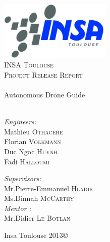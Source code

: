 \begin{titlepage}

\begin{center}


\includegraphics[width=0.4\textwidth]{./imgs/logo_insa.png}\\[2cm]    

\textsc{\LARGE INSA Toulouse}\\[1.5cm]

\textsc{\Large Project Release Report }\\[0.5cm]


\HRule \\[0.4cm]
{ \huge  Autonomous Drone Guide}\\[0.4cm]

\HRule \\[1.5cm]

\begin{minipage}{0.4\textwidth}
\begin{flushleft} \large
\emph{Engineers:}\\
Mathieu \textsc{Othacehe}\\
Florian \textsc{Volkmann}\\
Duc Ngoc \textsc{Huynh}\\
Fadi \textsc{Halloumi}\\
\end{flushleft}
\end{minipage}
\begin{minipage}{0.5\textwidth}
\begin{flushleft}
\large
\emph{Supervisors:} \\
Mr.Pierre-Emmanuel \textsc{Hladik}\\
Ms.Dinnah \textsc{McCarthy}\\
\emph{Mentor :} \\
Mr.Didier \textsc{Le Botlan}
\end{flushleft}
\end{minipage}

\vfill

{\large Insa Toulouse 2013\copyright}

\end{center}

\end{titlepage}
